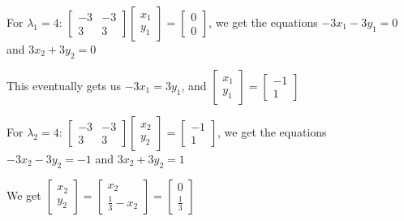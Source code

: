 \documentclass{article}
\begin{document}
\noindent For $\lambda_{1} = 4$: $\begin{bmatrix}
    -3 & -3 \\
    3 & 3
\end{bmatrix}
\begin{bmatrix}
    x_{1} \\
    y_{1}
\end{bmatrix} = 
\begin{bmatrix}
    0 \\
    0
\end{bmatrix}$, we get the equations $-3x_{1} - 3y_{1} = 0$ and $3x_{2} + 3y_{2} = 0$ \par
\noindent This eventually gets us $-3x_{1} = 3y_{1}$, and $\begin{bmatrix}
    x_{1} \\
    y_{1}
\end{bmatrix} = \begin{bmatrix}
    -1 \\
    1
\end{bmatrix}$
\par\vspace{0.25cm}
\noindent For $\lambda_{2} = 4$: $\begin{bmatrix}
    -3 & -3 \\
    3 & 3
\end{bmatrix}\begin{bmatrix}
    x_{2} \\
    y_{2}
\end{bmatrix}
=
\begin{bmatrix}
    -1 \\
    1
\end{bmatrix}$, we get the equations $-3x_{2} - 3y_{2} = -1$ and $3x_{2} + 3y_{2} = 1$ \par
\noindent We get $\begin{bmatrix}
    x_{2} \\
    y_{2}
\end{bmatrix}
=
\begin{bmatrix}
    x_{2} \\
    \frac{1}{3} - x_{2}
\end{bmatrix}
=
\begin{bmatrix}
    0 \\
    \frac{1}{3}
\end{bmatrix}$ \par\vspace{0.25cm}
\end{document}
